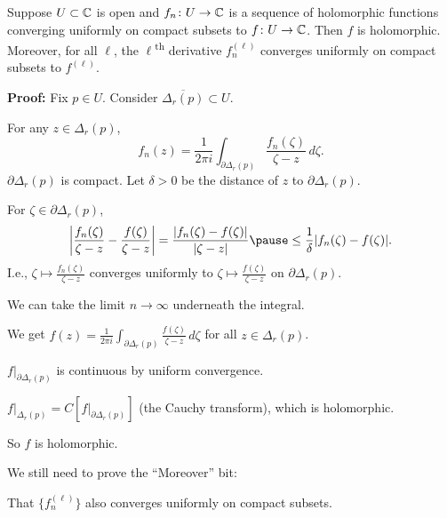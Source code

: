 \documentclass[10pt,aspectratio=169]{beamer}
\begin{document}
\begin{frame}

\begin{theorem}
Suppose $U \subset {\mathbb{C}}$ is open and $f_n \colon U \to {\mathbb{C}}$ is a sequence
of holomorphic functions converging uniformly on compact subsets to
$f \colon U \to {\mathbb{C}}$.
\pause
Then $f$ is holomorphic.
\pause
Moreover, for all $\ell$, the $\ell$\textsuperscript{th} derivative
$f_n^{(\ell)}$ converges uniformly on compact subsets to $f^{(\ell)}$.
\end{theorem}

\pause

\textbf{Proof:}
Fix $p \in U$.
\pause
Consider $\overline{\Delta_r(p)} \subset U$.

\medskip
\pause

For any $z \in \Delta_r(p)$,
\[
f_n(z) = \frac{1}{2\pi i}
\int_{\partial \Delta_r(p)} \frac{f_n(\zeta)}{\zeta-z} \, d\zeta .
\]
\pause
$\partial \Delta_r(p)$ is compact.
Let $\delta > 0$ be the distance of $z$ to
$\partial \Delta_r(p)$.

\medskip
\pause

For $\zeta \in \partial \Delta_r(p)$,
\begin{equation*}
\abs{\frac{f_n(\zeta)}{\zeta-z}
-
\frac{f(\zeta)}{\zeta-z}
}
=
\frac{\sabs{f_n(\zeta)-f(\zeta)}}{\sabs{\zeta-z}}
\pause
\leq
\frac{1}{\delta}
\sabs{f_n(\zeta)-f(\zeta)} .
\end{equation*}
\pause
I.e.,
$\zeta \mapsto \frac{f_n(\zeta)}{\zeta-z}$ converges uniformly to 
$\zeta \mapsto \frac{f(\zeta)}{\zeta-z}$ on $\partial \Delta_r(p)$.

\medskip
\pause

We can take the limit $n \to \infty$ underneath the integral.
\end{frame}

\begin{frame}
We get
\qquad
$
\displaystyle
f(z) = \frac{1}{2\pi i}
\int_{\partial \Delta_r(p)} \frac{f(\zeta)}{\zeta-z} \, d\zeta
$
\qquad
for all $z \in \Delta_r(p)$.

\medskip
\pause

$f|_{\partial \Delta_r(p)}$ is continuous by uniform convergence.

\medskip
\pause

$f|_{\Delta_r(p)} = C[f|_{\partial \Delta_r(p)}]$ (the Cauchy transform),
which is holomorphic.

\medskip
\pause

So $f$ is holomorphic.

\medskip
\pause

We still need to prove the ``Moreover'' bit:

That $\bigl\{ f_n^{(\ell)} \bigr\}$
also
converges uniformly on compact subsets.
\end{frame}
\end{document}
